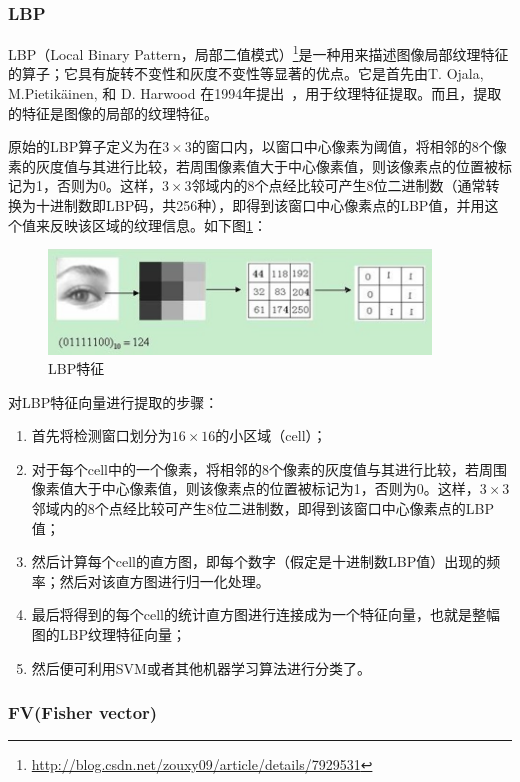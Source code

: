 \documentclass[12pt]{article}
\begin{document}
\subsubsection{LBP}

LBP（Local Binary Pattern，局部二值模式）\footnote{\url{http://blog.csdn.net/zouxy09/article/details/7929531}}是一种用来描述图像局部纹理特征的算子；它具有旋转不变性和灰度不变性等显著的优点。它是首先由T. Ojala, M.Pietikäinen, 和 D. Harwood 在1994年提出~\cite{ojala1994performance}，用于纹理特征提取。而且，提取的特征是图像的局部的纹理特征。
 
 原始的LBP算子定义为在$3\times3$的窗口内，以窗口中心像素为阈值，将相邻的8个像素的灰度值与其进行比较，若周围像素值大于中心像素值，则该像素点的位置被标记为1，否则为0。这样，$3\times3$邻域内的8个点经比较可产生8位二进制数（通常转换为十进制数即LBP码，共256种），即得到该窗口中心像素点的LBP值，并用这个值来反映该区域的纹理信息。如下图\ref{fig:lbp}：
    \begin{figure}[!ht]
    \centering
    \includegraphics[width=4in]{LBP}
    \caption{LBP特征}
    \label{fig:lbp}
    \end{figure}
   
对LBP特征向量进行提取的步骤：
\begin{enumerate}
    \item 首先将检测窗口划分为$16\times16$的小区域（cell）；
    \item 对于每个cell中的一个像素，将相邻的8个像素的灰度值与其进行比较，若周围像素值大于中心像素值，则该像素点的位置被标记为1，否则为0。这样，$3\times3$邻域内的8个点经比较可产生8位二进制数，即得到该窗口中心像素点的LBP值；
    \item 然后计算每个cell的直方图，即每个数字（假定是十进制数LBP值）出现的频率；然后对该直方图进行归一化处理。
    \item 最后将得到的每个cell的统计直方图进行连接成为一个特征向量，也就是整幅图的LBP纹理特征向量；
    \item 然后便可利用SVM或者其他机器学习算法进行分类了。
\end{enumerate}

\subsubsection{FV(Fisher vector)}
   
\end{document}
